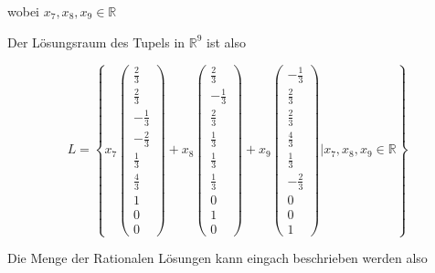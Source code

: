 wobei $x_7, x_8, x_9 \in \mathbb{R}$

Der Lösungsraum des Tupels in $\mathbb{R}^9$ ist also

\[
  L = \left\{
  x_7\begin{pmatrix}
    \frac{2}{3}   \\
    \frac{2}{3}   \\
    - \frac{1}{3} \\
    - \frac{2}{3} \\
    \frac{1}{3}   \\
    \frac{4}{3}   \\
    1             \\
    0             \\
    0
  \end{pmatrix} + x_8\begin{pmatrix}
    \frac{2}{3}  \\
    -\frac{1}{3} \\
    \frac{2}{3}  \\
    \frac{1}{3}  \\
    \frac{1}{3}  \\
    \frac{1}{3}  \\
    0            \\
    1            \\
    0
  \end{pmatrix} + x_9\begin{pmatrix}
    - \frac{1}{3} \\
    \frac{2}{3}   \\
    \frac{2}{3}   \\
    \frac{4}{3}   \\
    \frac{1}{3}   \\
    - \frac{2}{3} \\
    0             \\
    0             \\
    1
  \end{pmatrix} \Bigg| x_7, x_8, x_9 \in \mathbb{R}
  \right\}
\]

Die Menge der Rationalen Lösungen kann eingach beschrieben werden also

